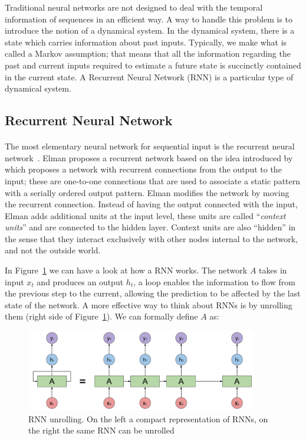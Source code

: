 Traditional neural networks are not designed to deal with the temporal information of sequences in an efficient way. A way to handle this problem is to introduce the notion of a dynamical system. In the dynamical system, there is a state which carries information about past inputs. Typically, we make what is called a Markov assumption; that means that all the information regarding the past and current inputs required to estimate a future state is succinctly contained in the current state. A Recurrent Neural Network (RNN) is a particular type of dynamical system.

\subsection{Recurrent Neural Network}
\paragraph{}
The most elementary neural network for sequential input is the recurrent neural network~\citep{elman1990finding}. Elman proposes a recurrent network based on the idea introduced by~\citet{jordan1986} which proposes a network with recurrent connections from the output to the input; these are one-to-one connections that are used to associate a static pattern with a serially ordered output pattern. Elman modifies the network by moving the recurrent connection. Instead of having the output connected with the input, Elman adds additional units at the input level, these units are called ``\textit{context units}'' and are connected to the hidden layer. Context units are also “hidden” in the sense that they interact exclusively with other nodes internal to the network, and not the outside world. 

In Figure~\ref{fig:rnn} we can have a look at how a RNN works. The network $A$ takes in input $x_t$ and produces an output $h_t$, a loop enables the information to flow from the previous step to the current, allowing the prediction to be affected by the last state of the network. A more effective way to think about RNNs is by unrolling them (right side of Figure~\ref{fig:rnn}). We can formally define $A$ as:

\begin{figure}[t]
        \centering
        \includegraphics[width=0.9\textwidth]{images/RNN.pdf}
        \caption{RNN unrolling. On the left a compact representation of RNNs, on the right the same RNN can be unrolled}
        \label{fig:rnn}
\end{figure}%

